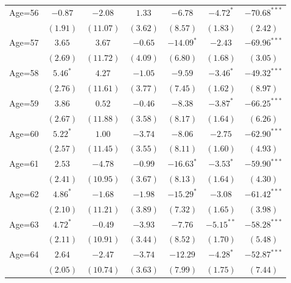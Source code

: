 \documentclass[fullpage]{paper}
\begin{document}
\begin{center}
\begin{longtable}{l c c c c c c }
Age=56      & $-0.87$       & $-2.08$      & $1.33$       & $-6.78$       & $-4.72^{*}$   & $-70.68^{***}$ \\
            & $(1.91)$      & $(11.07)$    & $(3.62)$     & $(8.57)$      & $(1.83)$      & $(2.42)$       \\
Age=57      & $3.65$        & $3.67$       & $-0.65$      & $-14.09^{*}$  & $-2.43$       & $-69.96^{***}$ \\
            & $(2.69)$      & $(11.72)$    & $(4.09)$     & $(6.80)$      & $(1.68)$      & $(3.05)$       \\
Age=58      & $5.46^{*}$    & $4.27$       & $-1.05$      & $-9.59$       & $-3.46^{*}$   & $-49.32^{***}$ \\
            & $(2.76)$      & $(11.61)$    & $(3.77)$     & $(7.45)$      & $(1.62)$      & $(8.97)$       \\
Age=59      & $3.86$        & $0.52$       & $-0.46$      & $-8.38$       & $-3.87^{*}$   & $-66.25^{***}$ \\
            & $(2.67)$      & $(11.88)$    & $(3.58)$     & $(8.17)$      & $(1.64)$      & $(6.26)$       \\
Age=60      & $5.22^{*}$    & $1.00$       & $-3.74$      & $-8.06$       & $-2.75$       & $-62.90^{***}$ \\
            & $(2.57)$      & $(11.45)$    & $(3.55)$     & $(8.11)$      & $(1.60)$      & $(4.93)$       \\
Age=61      & $2.53$        & $-4.78$      & $-0.99$      & $-16.63^{*}$  & $-3.53^{*}$   & $-59.90^{***}$ \\
            & $(2.41)$      & $(10.95)$    & $(3.67)$     & $(8.13)$      & $(1.64)$      & $(4.30)$       \\
Age=62      & $4.86^{*}$    & $-1.68$      & $-1.98$      & $-15.29^{*}$  & $-3.08$       & $-61.42^{***}$ \\
            & $(2.10)$      & $(11.21)$    & $(3.89)$     & $(7.32)$      & $(1.65)$      & $(3.98)$       \\
Age=63      & $4.72^{*}$    & $-0.49$      & $-3.93$      & $-7.76$       & $-5.15^{**}$  & $-58.28^{***}$ \\
            & $(2.11)$      & $(10.91)$    & $(3.44)$     & $(8.52)$      & $(1.70)$      & $(5.48)$       \\
Age=64      & $2.64$        & $-2.47$      & $-3.74$      & $-12.29$      & $-4.28^{*}$   & $-52.87^{***}$ \\
            & $(2.05)$      & $(10.74)$    & $(3.63)$     & $(7.99)$      & $(1.75)$      & $(7.44)$       \\

\end{longtable}
\end{center}
\end{document}
